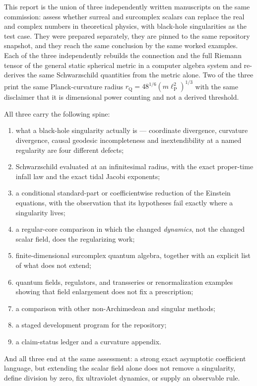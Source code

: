 \documentclass[11pt,letterpaper]{article}
\numberwithin{equation}{section}
\theoremstyle{definition}
\theoremstyle{remark}
\newcommand{\lP}{\ell_{\mathrm P}}
\begin{document}
This report is the union of three independently written manuscripts on the
same commission: assess whether surreal and surcomplex scalars can replace the
real and complex numbers in theoretical physics, with black-hole singularities
as the test case. They were prepared separately, they are pinned to the same
repository snapshot, and they reach the same conclusion by the same worked
examples. Each of the three independently rebuilds the connection and the full
Riemann tensor of the general static spherical metric in a computer algebra
system and re-derives the same Schwarzschild quantities from the metric alone.
Two of the three print the same Planck-curvature radius
$r_{\mathrm Q}=48^{1/6}(m\lP^{2})^{1/3}$ with the same disclaimer that it is
dimensional power counting and not a derived threshold.

All three carry the following spine:
\begin{enumerate}[label=\textup{(\roman*)},leftmargin=2.6em]
\item what a black-hole singularity actually is --- coordinate divergence,
curvature divergence, causal geodesic incompleteness and inextendibility at a
named regularity are four different defects;
\item Schwarzschild evaluated at an infinitesimal radius, with the exact
proper-time infall law and the exact tidal Jacobi exponents;
\item a conditional standard-part or coefficientwise reduction of the Einstein
equations, with the observation that its hypotheses fail exactly where a
singularity lives;
\item a regular-core comparison in which the changed \emph{dynamics}, not the
changed scalar field, does the regularizing work;
\item finite-dimensional surcomplex quantum algebra, together with an explicit
list of what does not extend;
\item quantum fields, regulators, and transseries or renormalization examples
showing that field enlargement does not fix a prescription;
\item a comparison with other non-Archimedean and singular methods;
\item a staged development program for the repository;
\item a claim-status ledger and a curvature appendix.
\end{enumerate}
And all three end at the same assessment: a strong exact asymptotic
coefficient language, but extending the scalar field alone does not remove a
singularity, define division by zero, fix ultraviolet dynamics, or supply an
observable rule.
\end{document}
